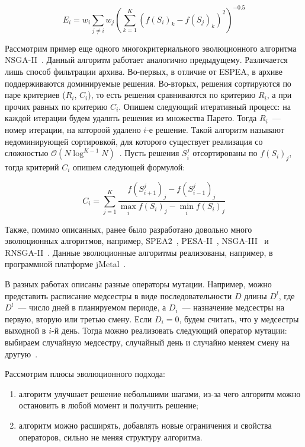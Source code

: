 \documentclass[times,specification,annotation]{itmo-student-thesis}
\begin{document}
\begin{equation} E_i = w_i \sum\limits_{j \neq i} w_j \left( \sum\limits_{k = 1}^{K}{\left( f(S_i)_k - f(S_j)_k \right)^2} \right)^{-0.5} \end{equation}

Рассмотрим пример еще одного многокритериального эволюционного алгоритма NSGA-II~\cite{996017}.
Данный алгоритм работает аналогично предыдущему.
Различается лишь способ фильтрации архива.
Во-первых, в отличие от ESPEA, в архиве поддерживаются доминируемые решения.
Во-вторых, решения сортируются по паре критериев ($R_i$, $C_i$), то есть решения сравниваются по критерию $R_i$, а при прочих равных по критерию $C_i$.
Опишем следующий итеративный процесс: на каждой итерации будем удалять решения из множества Парето.
Тогда $R_i$~--- номер итерации, на котороой удалено $i$-е решение.
Такой алгоритм называют недоминирующей сортировкой, для которого существует реализация со сложностью $\mathcal{O}( N\log^{K - 1}{N})$~\cite{buzdalov2014provably}.
Пусть решения $S_i^j$ отсортированы по $f(S_i)_j$, тогда критерий $C_i$ опишем следующей формулой:

\begin{equation} C_i = \sum\limits_{j = 1}^{K} \frac{f(S^j_{i+1})_j - f(S^j_{i-1})_j}{\max\limits_{i}{f(S_i)_j} - \min\limits_{i}{f(S_i)_j}} \end{equation}

Также, помимо описанных, ранее было разработано довольно много эволюционных алгоритмов, например, SPEA2~\cite{zitzler2001spea2}, PESA-II~\cite{10.5555/2955239.2955289}, NSGA-III~\cite{6600851} и RNSGA-II~\cite{kapelan2005multiobjective}.
Данные эволюционные алгоритмы реализованы, например, в программной платформе jMetal~\cite{durillo2006jmetal}.

В разных работах описаны разные операторы мутации.
Например, можно представить расписание медсестры в виде последовательности $D$ длины $D^l$, где $D^l$~--- число дней в планируемом периоде, а $D_i$~--- назначение медсестры на первую, вторую или третью смену.
Если $D_i = 0$, будем считать, что у медсестры выходной в $i$-й день.
Тогда можно реализовать следующий оператор мутации: выбираем случайную медсестру, случайный день и случайно меняем смену на другую~\cite{doi:10.1177/0954411919889560}.

Рассмотрим плюсы эволюционного подхода:

\begin{enumerate}
    \item алгоритм улучшает решение небольшими шагами, из-за чего алгоритм можно остановить в любой момент и получить решение;
    \item алгоритм можно расширять, добавлять новые ограничения и свойства операторов, сильно не меняя структуру алгоритма.
\end{enumerate}
\end{document}
